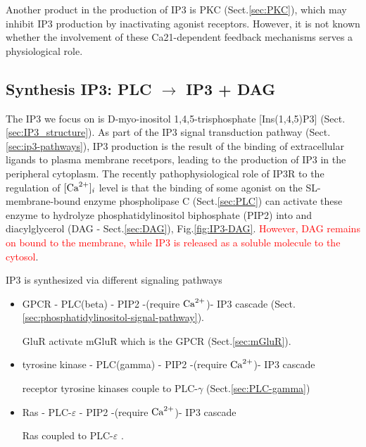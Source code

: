 Another product in the production of IP3 is PKC (Sect.\ref{sec:PKC}), which may
inhibit IP3 production by inactivating agonist receptors.
However, it is not known whether the involvement of these Ca21-dependent
feedback mechanisms serves a physiological role.





\subsection{Synthesis IP3: PLC $\rightarrow$ IP3 +
DAG}
\label{sec:IP3_synthesis}
\label{sec:IP3-production}


The IP3 we focus on is D-myo-inositol 1,4,5-trisphosphate [Ins(1,4,5)P3]
(Sect.\ref{sec:IP3_structure}). As part of the IP3 signal transduction pathway
(Sect.\ref{sec:ip3-pathways}), IP3 production is the result of the binding of extracellular ligands to plasma
membrane recetpors, leading to the production of IP3 in the peripheral
cytoplasm. The recently pathophysiological role of IP3R to the regulation of
$[{\text{Ca}^{2+}}]_i$ level is that the binding of some agonist on the SL-membrane-bound
enzyme phospholipase C (Sect.\ref{sec:PLC}) can activate these enzyme to
hydrolyze phosphatidylinositol biphosphate (PIP2) into \IPthree and
diacylglycerol (DAG - Sect.\ref{sec:DAG}), Fig.\ref{fig:IP3-DAG}.
\textcolor{red}{However, DAG remains on bound to the membrane, while
  IP3 is released as a soluble molecule to the cytosol}.


IP3 is synthesized via  different signaling pathways
\begin{itemize}
  \item  GPCR - PLC(beta) - PIP2 -(require ${\text{Ca}^{2+}}$)- IP3 cascade
(Sect.\ref{sec:phosphatidylinositol-signal-pathway}).

GluR activate mGluR which is the GPCR (Sect.\ref{sec:mGluR}).  

   \item tyrosine kinase - PLC(gamma) - PIP2 -(require ${\text{Ca}^{2+}}$)- IP3 cascade  
   
   receptor tyrosine kinases couple to PLC-$\gamma$
   (Sect.\ref{sec:PLC-gamma})
   
   \item Ras  - PLC-$\varepsilon$ - PIP2 -(require ${\text{Ca}^{2+}}$)- IP3 cascade
   
   Ras coupled to PLC-$\varepsilon$    \citep{kockskamper2008ip3}.
 
\end{itemize} 


